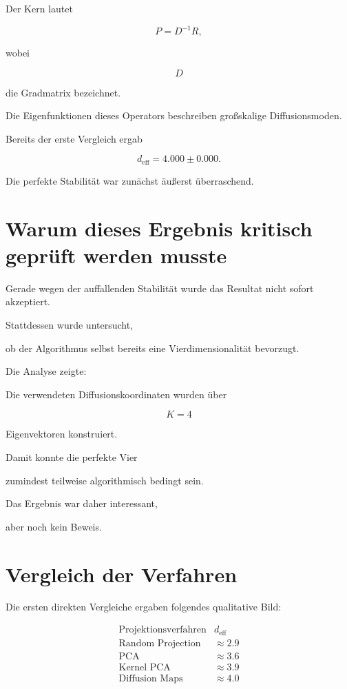 Der Kern lautet

\[
P
=
D^{-1}R,
\]

wobei

\[
D
\]

die Gradmatrix bezeichnet.

Die Eigenfunktionen dieses Operators beschreiben großskalige Diffusionsmoden.

Bereits der erste Vergleich ergab

\[
d_{\mathrm{eff}}
=
4.000
\pm
0.000.
\]

Die perfekte Stabilität war zunächst äußerst überraschend.


\section*{Warum dieses Ergebnis kritisch geprüft werden musste}

Gerade wegen der auffallenden Stabilität wurde das Resultat nicht sofort akzeptiert.

Stattdessen wurde untersucht,

ob der Algorithmus selbst bereits eine Vierdimensionalität bevorzugt.

Die Analyse zeigte:

Die verwendeten Diffusionskoordinaten wurden über

\[
K=4
\]

Eigenvektoren konstruiert.

Damit konnte die perfekte Vier

zumindest teilweise algorithmisch bedingt sein.

Das Ergebnis war daher interessant,

aber noch kein Beweis.


\section*{Vergleich der Verfahren}

Die ersten direkten Vergleiche ergaben folgendes qualitative Bild:

\[
\begin{array}{l|c}
\text{Projektionsverfahren}
&
d_{\mathrm{eff}}
\\
\hline
\text{Random Projection}
&
\approx2.9
\\
\text{PCA}
&
\approx3.6
\\
\text{Kernel PCA}
&
\approx3.9
\\
\text{Diffusion Maps}
&
\approx4.0
\end{array}
\]

